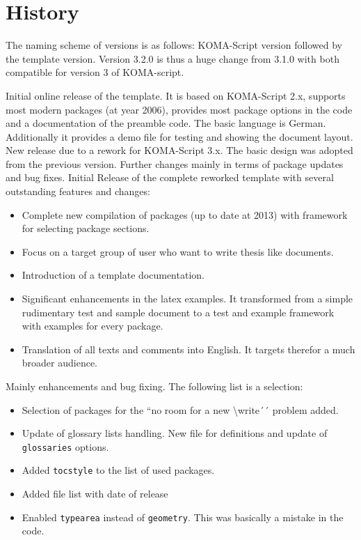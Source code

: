 
\chapter{History}

The naming scheme of versions is as follows: KOMA-Script version followed by the template version. Version 3.2.0 is thus
a huge change from 3.1.0 with both compatible for version 3 of KOMA-script.

Initial online release of the template. It is based on KOMA-Script 2.x,
supports most modern packages (at year 2006), provides most package options in the code
and a documentation of the preamble code. The basic language is German.
Additionally it provides a demo file for testing and showing the document layout.
%
New release due to a rework for KOMA-Script 3.x. 
The basic design was adopted from the previous version.
Further changes mainly in terms of package updates and bug fixes.
%
Initial Release of the complete reworked template with several outstanding features and changes:
\begin{itemize}
\item Complete new compilation of packages (up to date at 2013) with framework for selecting package sections. 
\item Focus on a target group of user who want to write thesis like documents.
\item Introduction of a template documentation.
\item Significant enhancements in the latex examples. 
It transformed from a simple rudimentary test and sample document to a test and example framework
with examples for every package.
\item Translation of all texts and comments into English. It targets therefor a much broader audience.
\end{itemize}
%
Mainly enhancements and bug fixing. The following list is a selection:
\begin{itemize}
\item Selection of packages for the ``no room for a new \textbackslash{}write´´ problem added.  
\item Update of glossary lists handling. New file for definitions and update of \texttt{glossaries} options.
\item Added \texttt{tocstyle} to the list of used packages.
\item Added file list with date of release
\item Enabled \texttt{typearea} instead of \texttt{geometry}. This was basically a mistake in the code.
\end{itemize}
